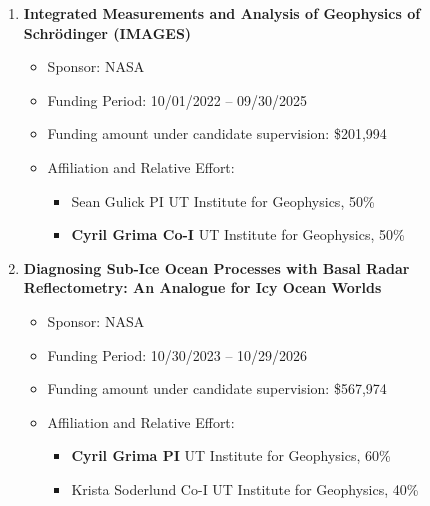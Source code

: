 \begin{enumerate}[leftmargin=2.5em, labelsep=1.5em, label=C\arabic*]
    \item
        \textbf{Integrated Measurements and Analysis of Geophysics of Schrödinger (IMAGES)}
        \begin{itemize}[leftmargin=0em, labelsep=1em, topsep=-.5em, itemsep=-.2em]
            \item Sponsor: NASA
            \item Funding Period: 10/01/2022 – 09/30/2025
            \item Funding amount under candidate supervision: \$201,994
            \item Affiliation and Relative Effort:
            \TabPositions{4cm, 5.5cm}
            \begin{itemize}[leftmargin=2em, labelsep=1em, topsep=-.5em, itemsep=-.2em]
                \item Sean Gulick \tab PI \tab  UT Institute for Geophysics, 50\%
                \item \textbf{Cyril Grima \tab Co-I} \tab  UT Institute for Geophysics, 50\%
            \end{itemize}
        \end{itemize}

    \item
        \textbf{Diagnosing Sub-Ice Ocean Processes with Basal Radar Reflectometry: An Analogue for Icy Ocean Worlds}
        \begin{itemize}[leftmargin=0em, labelsep=1em, topsep=-.5em, itemsep=-.2em]
            \item Sponsor: NASA
            \item Funding Period: 10/30/2023 – 10/29/2026
            \item Funding amount under candidate supervision: \$567,974
            \item Affiliation and Relative Effort:
            \TabPositions{4cm, 5.5cm}
            \begin{itemize}[leftmargin=2em, labelsep=1em, topsep=-.5em, itemsep=-.2em]
                \item \textbf{Cyril Grima \tab PI} \tab  UT Institute for Geophysics, 60\%
                \item Krista Soderlund \tab Co-I \tab  UT Institute for Geophysics, 40\%
            \end{itemize}
        \end{itemize}


\end{enumerate}
